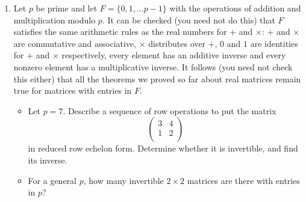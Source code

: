 \documentclass{amsart}
\begin{document}
\begin{enumerate}
  
\item Let $p$ be prime and let $F = \{ 0, 1 , \ldots p -1 \}$ with the operations of addition and multiplication modulo $p$.
  It can be checked (you need not do this) that $F$ satisfies the same arithmetic rules as the real numbers for $+$ and $\times$: $+$ and $\times$ are
  commutative and associative, $\times$ distributes over $+$, $0$ and $1$ are identities for $+$ and $\times$ respectively,
  every element has an additive inverse and every nonzero element has a multiplicative inverse. It follows (you need not check this either)
  that all the theorems we proved so far about real matrices remain true for matrices with entries in $F$.

  \begin{itemize}

  \item Let $p = 7$. Describe a sequence of row operations to put the matrix
    \[
    \left (
    \begin{array}{rr}
      3 & 4 \\
      1 & 2 \\
    \end{array}
    \right )
    \]
    in reduced row echelon form. Determine whether it is invertible, and find its inverse.
    
  \item For a general $p$, how many invertible $2 \times 2$ matrices are there with entries in $p$?

  \end{itemize}

  
\end{enumerate} 


   
\end{document}
